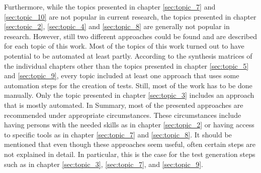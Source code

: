 Furthermore, while the topics presented in chapter \ref{sec:topic_7} and \ref{sec:topic_10} are not popular in current research, the topics presented in chapter \ref{sec:topic_2}, \ref{sec:topic_4} and \ref{sec:topic_8} are generally not popular in research. However, still two different approaches could be found and are described for each topic of this work. Most of the topics of this work turned out to have potential to be automated at least partly. According to the synthesis matrices of the individual chapters other than the topics presented in chapter \ref{sec:topic_5} and \ref{sec:topic_9}, every topic included at least one approach that uses some automation steps for the creation of tests. Still, most of the work has to be done manually. Only the topic presented in chapter \ref{sec:topic_3} includes an approach that is mostly automated.
\newpage
In Summary, most of the presented approaches are recommended under appropriate circumstances. These circumstances include having persons with the needed skills as in chapter \ref{sec:topic_2} or having access to specific tools as in chapter \ref{sec:topic_7} and \ref{sec:topic_8}. It should be mentioned that even though these approaches seem useful, often certain steps are not explained in detail. In particular, this is the case for the test generation steps such as in chapter \ref{sec:topic_3}, \ref{sec:topic_7}, and \ref{sec:topic_9}. 
